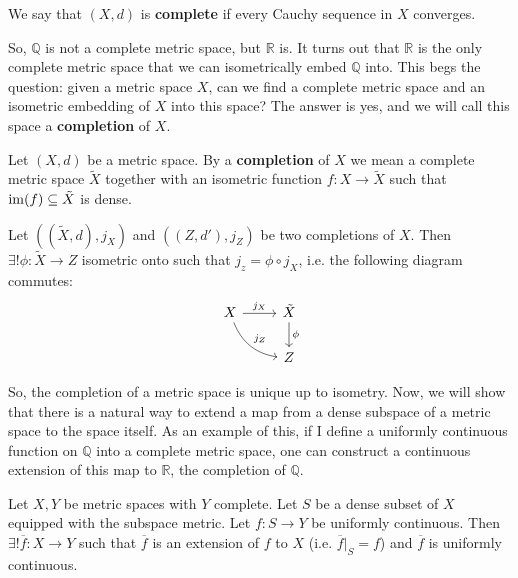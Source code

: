 	\begin{definition}
		We say that $(X, d)$ is \textbf{complete} if every Cauchy sequence in $X$ converges.
	\end{definition}
	
	So, $\mathbb Q$ is not a complete metric space, but $\mathbb R$ is. It turns out that $\mathbb R$ is the only complete metric space that we can isometrically 
	embed $\mathbb Q$ into. This begs the question: given a metric space $X$, can we find a complete metric space and an isometric embedding of $X$ into 
	this space? The answer is yes, and we will call this space a \textbf{completion} of $X$.
	
	\begin{definition}[Completion]
		Let $(X, d)$ be a metric space. By a \textbf{completion} of $X$ we mean a complete metric space $\tilde X$ together with an isometric function $f : X
		\rightarrow\tilde X$ such that $\mathrm{im}(f)\subseteq\tilde X$ is dense.
	\end{definition}
	
	\begin{prop}
		Let $((\tilde X, d), j_X)$ and $(( Z, d'), j_Z)$ be two completions of $X$. Then $\exists !\phi : \tilde X\rightarrow Z$ isometric onto such that $j_z = 
		\phi\circ j_X$, i.e. the following diagram commutes:
		\[
		\begin{tikzcd}
			X \arrow[r, "j_X"] \arrow[rd, bend right, "j_Z"] & \tilde X \arrow[d, "\phi"] \\
			& Z
		\end{tikzcd}
		\]
	\end{prop}
	
	So, the completion of a metric space is unique up to isometry. Now, we will show that there is a natural way to extend a map from a dense subspace of a 
	metric space to the space itself. As an example of this, if I define a uniformly continuous function on $\mathbb Q$ into a complete metric space, one can 
	construct a continuous extension of this map to $\mathbb R$, the completion of $\mathbb Q$. 
	
	\begin{prop}
		Let $X, Y$ be metric spaces with $Y$ complete. Let $S$ be a dense subset of $X$ equipped with the subspace metric. Let $f : S\rightarrow Y$ be 
		uniformly continuous. Then $\exists ! \overline f : X\rightarrow Y$ such that $\overline f$ is an extension of $f$ to $X$ (i.e. $\overline f|_S = f$) and 
		$\overline f$ is uniformly continuous.
	\end{prop}
	
